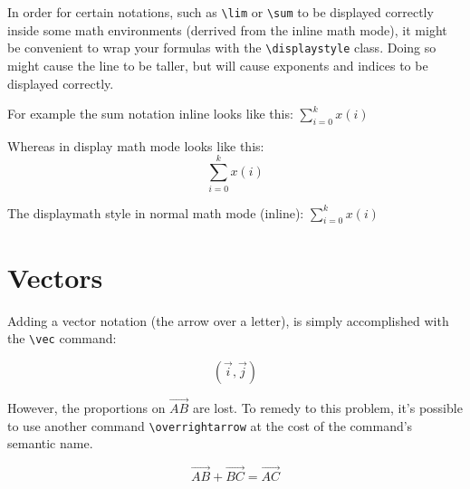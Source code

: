 \documentclass[a4paper]{article}
\begin{document}
In order for certain notations, such as \verb`\lim` or \verb`\sum` to be
displayed correctly inside some math environments (derrived from the inline
math mode), it might be convenient to wrap your formulas with the
\verb`\displaystyle` class. Doing so might cause the line to be taller, but
will cause exponents and indices to be displayed correctly.

For example the sum notation inline looks like this: $\sum_{i = 0}^{k}{x(i)}$

Whereas in display math mode looks like this:
$$\sum_{i = 0}^{k}{x(i)}$$

The displaymath style in normal math mode (inline):
$\displaystyle{\sum_{i = 0}^{k}{x(i)}}$

\section{Vectors}

Adding a vector notation (the arrow over a letter), is simply accomplished
with the \verb`\vec` command:

$$(\vec{i}, \vec{j})$$

However, the proportions on $\vec{AB}$ are lost. To remedy to this problem,
it's possible to use another command \verb`\overrightarrow` at the cost of the
command's semantic name.

$$\overrightarrow{AB} + \overrightarrow{BC} = \overrightarrow{AC}$$
\end{document}
